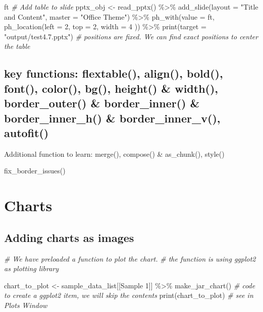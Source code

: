 \documentclass[
]{book}
\newenvironment{Shaded}{\begin{snugshade}}{\end{snugshade}}
\newcommand{\AttributeTok}[1]{\textcolor[rgb]{0.77,0.63,0.00}{#1}}
\newcommand{\CommentTok}[1]{\textcolor[rgb]{0.56,0.35,0.01}{\textit{#1}}}
\newcommand{\DecValTok}[1]{\textcolor[rgb]{0.00,0.00,0.81}{#1}}
\newcommand{\FunctionTok}[1]{\textcolor[rgb]{0.00,0.00,0.00}{#1}}
\newcommand{\NormalTok}[1]{#1}
\newcommand{\OtherTok}[1]{\textcolor[rgb]{0.56,0.35,0.01}{#1}}
\newcommand{\SpecialCharTok}[1]{\textcolor[rgb]{0.00,0.00,0.00}{#1}}
\newcommand{\StringTok}[1]{\textcolor[rgb]{0.31,0.60,0.02}{#1}}
\begin{document}
\begin{Shaded}
\begin{Highlighting}[]
\NormalTok{ft}
\CommentTok{\# Add table to slide}
\NormalTok{pptx\_obj }\OtherTok{\textless{}{-}} \FunctionTok{read\_pptx}\NormalTok{() }\SpecialCharTok{\%\textgreater{}\%}
  \FunctionTok{add\_slide}\NormalTok{(}\AttributeTok{layout =} \StringTok{"Title and Content"}\NormalTok{, }\AttributeTok{master =} \StringTok{"Office Theme"}\NormalTok{) }\SpecialCharTok{\%\textgreater{}\%}
  \FunctionTok{ph\_with}\NormalTok{(}\AttributeTok{value =}\NormalTok{ ft, }\FunctionTok{ph\_location}\NormalTok{(}\AttributeTok{left =} \DecValTok{2}\NormalTok{, }\AttributeTok{top =} \DecValTok{2}\NormalTok{, }\AttributeTok{width =} \DecValTok{4}\NormalTok{ )) }\SpecialCharTok{\%\textgreater{}\%} 
  \FunctionTok{print}\NormalTok{(}\AttributeTok{target =} \StringTok{"output/test4.7.pptx"}\NormalTok{) }
\CommentTok{\# positions are fixed. We can find exact positions to center the table}
\end{Highlighting}
\end{Shaded}

\hypertarget{key-functions-flextable-align-bold-font-color-bg-height-width-border_outer-border_inner-border_inner_h-border_inner_v-autofit}{%
\subsection{key functions: flextable(), align(), bold(), font(), color(), bg(), height() \& width(), border\_outer() \& border\_inner() \& border\_inner\_h() \& border\_inner\_v(), autofit()}\label{key-functions-flextable-align-bold-font-color-bg-height-width-border_outer-border_inner-border_inner_h-border_inner_v-autofit}}

Additional function to learn: merge(), compose() \& as\_chunk(), style()

fix\_border\_issues()

\hypertarget{charts-1}{%
\section{Charts}\label{charts-1}}

\hypertarget{adding-charts-as-images}{%
\subsection{Adding charts as images}\label{adding-charts-as-images}}

\begin{Shaded}
\begin{Highlighting}[]
\CommentTok{\# We have preloaded a function to plot the chart.}
\CommentTok{\# the function is using ggplot2 as plotting library}

\NormalTok{chart\_to\_plot }\OtherTok{\textless{}{-}}\NormalTok{ sample\_data\_list[[}\StringTok{\textquotesingle{}Sample 1\textquotesingle{}}\NormalTok{]] }\SpecialCharTok{\%\textgreater{}\%}
  \FunctionTok{make\_jar\_chart}\NormalTok{() }\CommentTok{\# code to create a ggplot2 item, we will skip the contents}
\FunctionTok{print}\NormalTok{(chart\_to\_plot) }\CommentTok{\# see in Plots Window}
\end{Highlighting}
\end{Shaded}
\end{document}
